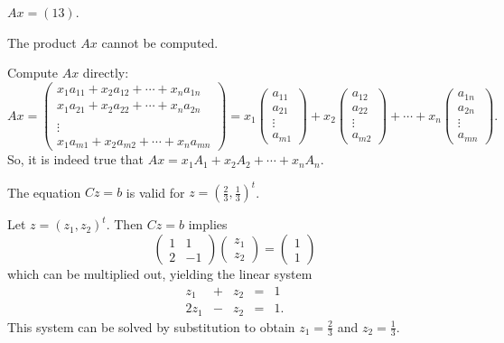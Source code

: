 \documentclass{ximera}
\begin{document}
 $Ax = \left(13\right)$.

 The product $Ax$ cannot be computed.

Compute $Ax$ directly:
\[ Ax = \left(\begin{array}{c} x_1a_{11} + x_2a_{12} + \cdots +
x_na_{1n} \\  x_1a_{21} + x_2a_{22} + \cdots + x_na_{2n} \\
\\ \vdots \\ x_1a_{m1} + x_2a_{m2} + \cdots + x_na_{mn}
\end{array}\right) = x_1\left(\begin{array}{r} a_{11} \\ a_{21} \\
\vdots \\ a_{m1} \end{array}\right) + x_2\left(\begin{array}{r}
a_{12} \\ a_{22} \\ \vdots \\ a_{m2} \end{array}\right) + \cdots
+ x_n\left(\begin{array}{r} a_{1n} \\ a_{2n} \\
\vdots \\ a_{mn} \end{array}\right). \]
So, it is indeed true that $Ax = x_1A_1 + x_2A_2 + \cdots
+ x_nA_n$.

\newpage
{}
\ans The equation $Cz = b$ is valid for $z = (\frac{2}{3},\frac{1}{3})^t$.

\soln Let $z = (z_1,z_2)^t$.  Then $Cz = b$ implies
\[
\left(\begin{array}{rr} 1 & 1 \\ 2 & -1\end{array}\right)
\left(\begin{array}{r} z_1 \\ z_2\end{array}\right) =
\left(\begin{array}{r} 1 \\ 1\end{array}\right)
\]
which can be multiplied out, yielding the linear system
\[\begin{array}{rrrrl}
z_1 & + & z_2 & = & 1 \\
2z_1 & - & z_2 & = & 1.\end{array} \]
This system can be solved by substitution to obtain $z_1 =
\frac{2}{3}$ and $z_2 = \frac{1}{3}$.
\end{document}
